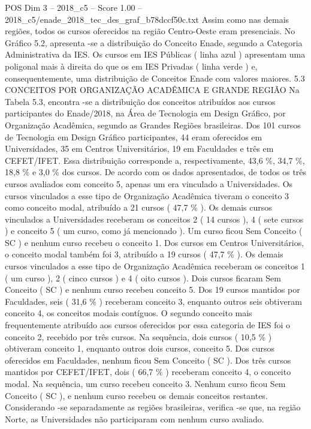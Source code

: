 \begin{textsample}{POS Dim 3 – 2018\_c5 – Score 1.00 – 2018\_c5/enade\_2018\_tec\_des\_graf\_b78dccf50c.txt}
Assim como nas demais regiões, todos os cursos oferecidos na região Centro-Oeste eram presenciais.
No Gráfico 5.2, apresenta -se a distribuição do Conceito Enade, segundo a Categoria Administrativa da IES.
Os cursos em IES Públicas ( linha azul ) apresentam uma poligonal mais à direita do que os em IES Privadas ( linha verde ) e, consequentemente, uma distribuição de Conceitos Enade com valores maiores. 5.3 CONCEITOS POR ORGANIZAÇÃO ACADÊMICA E GRANDE REGIÃO Na Tabela 5.3, encontra -se a distribuição dos conceitos atribuídos aos cursos participantes do Enade/2018, na Área de Tecnologia em Design Gráfico, por Organização Acadêmica, segundo as Grandes Regiões brasileiras.
Dos 101 cursos de Tecnologia em Design Gráfico participantes, 44 eram oferecidos em Universidades, 35 em Centros Universitários, 19 em Faculdades e três em CEFET/IFET.
Essa distribuição corresponde a, respectivamente, 43,6 \%, 34,7 \%, 18,8 \% e 3,0 \% dos cursos.
De acordo com os dados apresentados, de todos os três cursos avaliados com conceito 5, apenas um era vinculado a Universidades.
Os cursos vinculados a esse tipo de Organização Acadêmica tiveram o conceito 3 como conceito modal, atribuído a 21 cursos ( 47,7 \% ).
Os demais cursos vinculados a Universidades receberam os conceitos 2 ( 14 cursos ), 4 ( sete cursos ) e conceito 5 ( um curso, como já mencionado ).
Um curso ficou Sem Conceito ( SC ) e nenhum curso recebeu o conceito 1.
Dos cursos em Centros Universitários, o conceito modal também foi 3, atribuído a 19 cursos ( 47,7 \% ).
Os demais cursos vinculados a esse tipo de Organização Acadêmica receberam os conceitos 1 ( um curso ), 2 ( cinco cursos ) e 4 ( oito cursos ).
Dois cursos ficaram Sem Conceito ( SC ) e nenhum curso recebeu conceito 5.
Dos 19 cursos mantidos por Faculdades, seis ( 31,6 \% ) receberam conceito 3, enquanto outros seis obtiveram conceito 4, os conceitos modais contíguos.
O segundo conceito mais frequentemente atribuído aos cursos oferecidos por essa categoria de IES foi o conceito 2, recebido por três cursos.
Na sequência, dois cursos ( 10,5 \% ) obtiveram conceito 1, enquanto outros dois cursos, conceito 5.
Dos cursos oferecidos em Faculdades, nenhum ficou Sem Conceito ( SC ).
Dos três cursos mantidos por CEFET/IFET, dois ( 66,7 \% ) receberam conceito 4, o conceito modal.
Na sequência, um curso recebeu conceito 3.
Nenhum curso ficou Sem Conceito ( SC ), e nenhum curso recebeu os demais conceitos restantes.
Considerando -se separadamente as regiões brasileiras, verifica -se que, na região Norte, as Universidades não participaram com nenhum curso avaliado.

\end{textsample}
